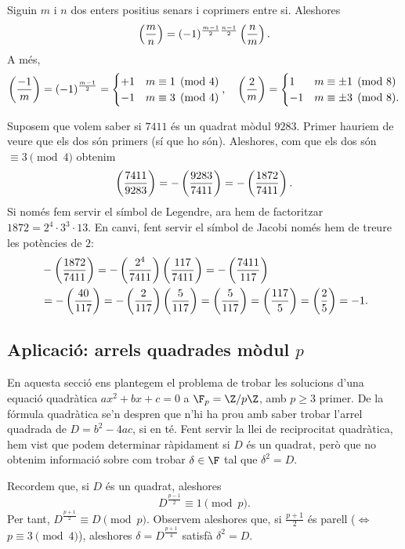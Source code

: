  \begin{theorem}
\label{thm:lrq-jacobi}
Siguin $m$ i $n$ dos enters positius senars i coprimers entre si. Aleshores
\[
    \left(\frac{m}{n}\right) = (-1)^{\frac{m-1}{2}\frac{n-1}{2}}\left(\frac{n}{m}\right).
    \]
A més,
\[
\left(\frac{-1}{m}\right) = (-1)^{\frac{m-1}{2}}=\begin{cases}
+1&m\equiv 1\pmod{4}\\
-1&m\equiv 3\pmod{4}
\end{cases}
,\quad \left(\frac{2}{m}\right) = \begin{cases}
1 & m\equiv \pm 1\pmod {8}\\
-1 & m \equiv \pm 3 \pmod{8}.
\end{cases}
\]
\end{theorem}

\begin{example}
 Suposem que volem saber si $7411$ és un quadrat mòdul $9283$. Primer hauriem de veure que els dos són primers (sí que ho són). Aleshores, com que els dos són $\equiv 3\pmod 4$ obtenim
 \[
 \left(\frac{7411}{9283}\right) = -\left(\frac{9283}{7411}\right)=-\left(\frac{1872}{7411}\right).
 \]
 Si només fem servir el símbol de Legendre, ara hem de factoritzar $1872=2^4\cdot 3^3\cdot 13$. En canvi, fent servir el símbol de Jacobi només hem de treure les potències de $2$:
 \begin{align*}
 &-\left(\frac{1872}{7411}\right) =-\left(\frac{2^4}{7411}\right)\left(\frac{117}{7411}\right) = -\left(\frac{7411}{117}\right)\\
 &=-\left(\frac{40}{117}\right) = -\left(\frac{2}{117}\right)\left(\frac{5}{117}\right) = \left(\frac{5}{117}\right)=\left(\frac{117}{5}\right) = \left(\frac{2}{5}\right)=-1.
 \end{align*}
\end{example}
 \subsection{Aplicació: arrels quadrades mòdul \texorpdfstring{$p$}{p}}
 \label{sec:arrels-quadrades}
 
 En aquesta secció ens plantegem el problema de trobar les solucions d'una equació quadràtica $ax^2+bx+c=0$ a $\F_p=\Z/p\Z$, amb $p\geq 3$ primer. De la fórmula quadràtica se'n despren que n'hi ha prou amb saber trobar l'arrel quadrada de $D=b^2-4ac$, si en té. Fent servir la llei de reciprocitat quadràtica, hem vist que podem determinar ràpidament si $D$ és un quadrat, però que no obtenim informació sobre com trobar $\delta\in \F$ tal que $\delta^2=D$.
 
 Recordem que, si $D$ és un quadrat, aleshores
 \[
 D^{\frac{p-1}{2}}\equiv 1\pmod p.
 \]
 Per tant, $D^{\frac{p+1}{2}} \equiv D\pmod p$. Observem aleshores que, si $\frac{p+1}{2}$ és parell ($\iff$ $p\equiv 3\pmod 4$), aleshores $\delta=D^{\frac{p+1}{4}}$ satisfà $\delta^2=D$.
 
